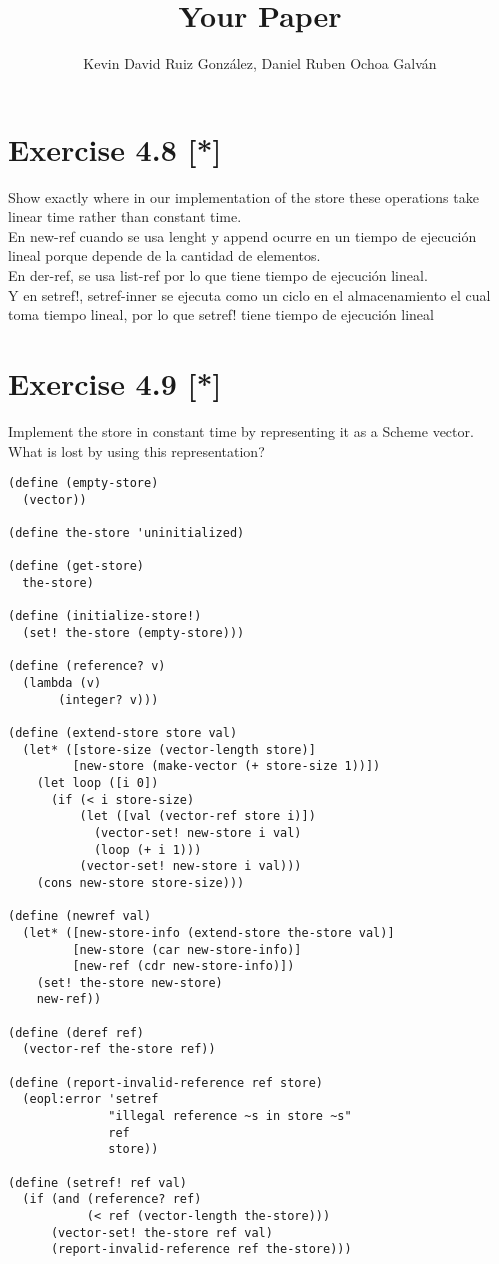 \documentclass{article}
\title{Your Paper}
\author{Kevin David Ruiz González, Daniel Ruben Ochoa Galván}
\begin{document}
\maketitle

\section{Exercise 4.8 [*]}
Show exactly where in our implementation of the store these operations take linear time rather than constant time.\\
En new-ref cuando se usa lenght y append ocurre en un tiempo de ejecución lineal porque depende de la cantidad de elementos.\\
En der-ref, se usa list-ref por lo que tiene tiempo de ejecución lineal. \\
Y en setref!, setref-inner se ejecuta como un ciclo en el almacenamiento el cual toma tiempo lineal, por lo que setref! tiene tiempo de ejecución lineal 


\section{Exercise 4.9 [*] }
 Implement the store in constant time by representing it as a Scheme
vector. What is lost by using this representation?
\begin{Verbatim}
(define (empty-store)
  (vector))

(define the-store 'uninitialized)

(define (get-store)
  the-store)

(define (initialize-store!)
  (set! the-store (empty-store)))

(define (reference? v)
  (lambda (v)
       (integer? v)))

(define (extend-store store val)
  (let* ([store-size (vector-length store)]
         [new-store (make-vector (+ store-size 1))])
    (let loop ([i 0])
      (if (< i store-size)
          (let ([val (vector-ref store i)])
            (vector-set! new-store i val)
            (loop (+ i 1)))
          (vector-set! new-store i val)))
    (cons new-store store-size)))

(define (newref val)
  (let* ([new-store-info (extend-store the-store val)]
         [new-store (car new-store-info)]
         [new-ref (cdr new-store-info)])
    (set! the-store new-store)
    new-ref))

(define (deref ref)
  (vector-ref the-store ref))

(define (report-invalid-reference ref store)
  (eopl:error 'setref
              "illegal reference ~s in store ~s"
              ref
              store))

(define (setref! ref val)
  (if (and (reference? ref)
           (< ref (vector-length the-store)))
      (vector-set! the-store ref val)
      (report-invalid-reference ref the-store)))
\end{Verbatim}
\end{document}
